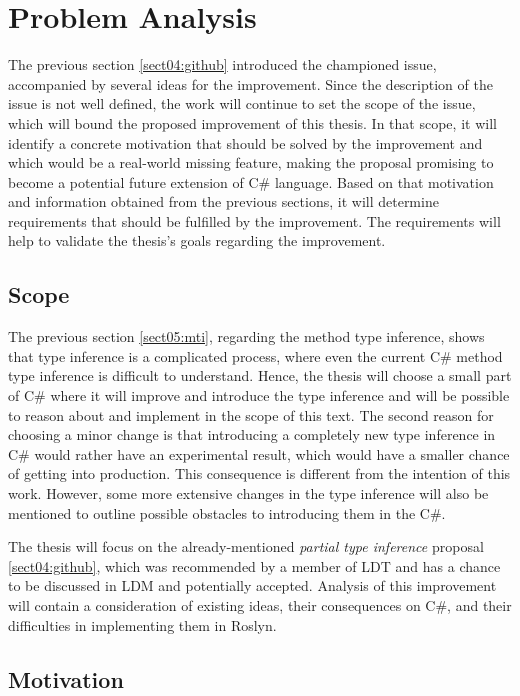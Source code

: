\chapter{Problem Analysis}

The previous section \ref{sect04:github} introduced the championed issue, accompanied by several ideas for the improvement.
Since the description of the issue is not well defined, the work will continue to set the scope of the issue, which will bound the proposed improvement of this thesis. 
In that scope, it will identify a concrete motivation that should be solved by the improvement and which would be a real-world missing feature, making the proposal promising to become a potential future extension of C\# language. 
Based on that motivation and information obtained from the previous sections, it will determine requirements that should be fulfilled by the improvement. 
The requirements will help to validate the thesis’s goals regarding the improvement.

\section{Scope}

The previous section \ref{sect05:mti}, regarding the method type inference, shows that type inference is a complicated process, where even the current C\# method type inference is difficult to understand. 
Hence, the thesis will choose a small part of C\# where it will improve and introduce the type inference and will be possible to reason about and implement in the scope of this text. 
The second reason for choosing a minor change is that introducing a completely new type inference in C\# would rather have an experimental result, which would have a smaller chance of getting into production. 
This consequence is different from the intention of this
work. 
However, some more extensive changes in the type inference will also be mentioned to outline possible obstacles to introducing them in the C\#.
\par
The thesis will focus on the already-mentioned \textit{partial type inference} proposal \ref{sect04:github}, which was recommended by a member of LDT and has a chance to be discussed in LDM and potentially accepted. 
Analysis of this improvement will contain a consideration of existing ideas, their consequences on C\#, and their difficulties in implementing them in Roslyn.

\section{Motivation} \label{sect10:mot}


